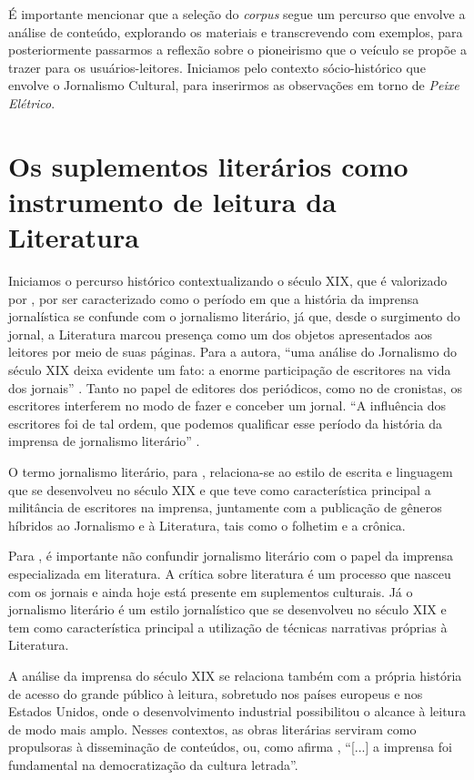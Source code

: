 \documentclass[portuguese]{textolivre}
\begin{document}
É importante mencionar que a seleção do \textit{corpus} segue um percurso que envolve a análise de conteúdo, explorando os materiais e transcrevendo com exemplos, para posteriormente passarmos a reflexão sobre o pioneirismo que o veículo se propõe a trazer para os usuários-leitores. Iniciamos pelo contexto sócio-histórico que envolve o Jornalismo Cultural, para inserirmos as observações em torno de \textit{Peixe Elétrico}.

\section{Os suplementos literários como instrumento de leitura da Literatura}\label{sec-normas}
Iniciamos o percurso histórico contextualizando o século XIX, que é valorizado por \textcite{arnt2001}, por ser caracterizado como o período em que a história da imprensa jornalística se confunde com o jornalismo literário, já que, desde o surgimento do jornal, a Literatura marcou presença como um dos objetos apresentados aos leitores por meio de suas páginas. Para a autora, “uma análise do Jornalismo do século XIX deixa evidente um fato: a enorme participação de escritores na vida dos jornais” \cite[p. 07]{arnt2001}. Tanto no papel de editores dos periódicos, como no de cronistas, os escritores interferem no modo de fazer e conceber um jornal. “A influência dos escritores foi de tal ordem, que podemos qualificar esse período da história da imprensa de jornalismo literário” \cite[p. 07]{arnt2001}.

O termo jornalismo literário, para \textcite[p. 07-08]{arnt2001}, relaciona-se ao estilo de escrita e linguagem que se desenvolveu no século XIX e que teve como característica principal a militância de escritores na imprensa, juntamente com a publicação de gêneros híbridos ao Jornalismo e à Literatura, tais como o folhetim e a crônica.

Para \textcite{arnt2001}, é importante não confundir jornalismo literário com o papel da imprensa especializada em literatura. A crítica sobre literatura é um processo que nasceu com os jornais e ainda hoje está presente em suplementos culturais. Já o jornalismo literário é um estilo jornalístico que se desenvolveu no século XIX e tem como característica principal a utilização de técnicas narrativas próprias à Literatura.

A análise da imprensa do século XIX se relaciona também com a própria história de acesso do grande público à leitura, sobretudo nos países europeus e nos Estados Unidos, onde o desenvolvimento industrial possibilitou o alcance à leitura de modo mais amplo. Nesses contextos, as obras literárias serviram como propulsoras à disseminação de conteúdos, ou, como afirma \textcite[p. 08]{arnt2001}, “[...] a imprensa foi fundamental na democratização da cultura letrada”.
\end{document}
